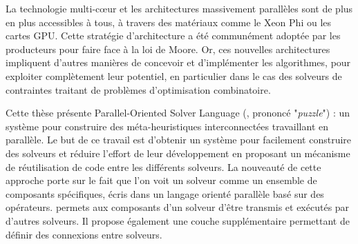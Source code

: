 \documentclass{jfpc-preprint}
\begin{document}

\maketitle

%
%

\begin{resume} %
La technologie multi-c\oe ur et les architectures massivement parallèles sont de plus en plus accessibles à tous, à travers des matériaux comme le Xeon Phi ou les cartes GPU. Cette stratégie d'architecture a été communément adoptée par les producteurs pour faire face à la loi de Moore. Or, ces nouvelles architectures impliquent d'autres manières de concevoir et d'implémenter les algorithmes, pour exploiter complètement leur potentiel, en particulier dans le cas des solveurs de contraintes traitant de problèmes d'optimisation combinatoire.

Cette  thèse présente Parallel-Oriented Solver Language (\posl{}, prononcé "{\it  puzzle}") : un système pour construire des méta-heuristiques interconnectées travaillant en parallèle. Le but de ce travail est d'obtenir un système pour facilement construire des solveurs et réduire l'effort  de leur  développement en  proposant un mécanisme de réutilisation de code entre les différents solveurs. La nouveauté de cette approche porte sur le fait que l'on voit un solveur comme un ensemble de composants spécifiques, écris dans un langage orienté parallèle basé sur des opérateurs. \posl{}  permets aux composants d'un solveur d'être transmis et exécutés par d'autres  solveurs. Il propose également une couche supplémentaire permettant de définir des connexions entre solveurs.
\end{resume}
\end{document}
